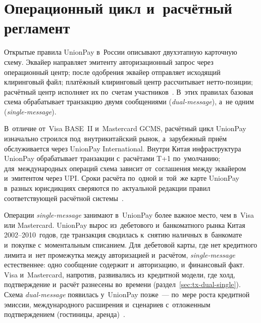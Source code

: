 
\section{Операционный цикл и~расчётный регламент}\label{sec:up-architecture}

Открытые правила UnionPay в~России описывают двухэтапную карточную схему.
Эквайер направляет эмитенту авторизационный запрос через операционный центр;
после одобрения эквайер отправляет исходящий клиринговый файл; платёжный
клиринговый центр рассчитывает нетто-позиции; расчётный центр исполняет их
по~счетам участников~\cite{unionpay-russia-rules}. В~этих правилах базовая
схема обрабатывает транзакцию двумя сообщениями (\textit{dual-message}), а~не одним
(\textit{single-message}).

В~отличие от~Visa BASE~II и~Mastercard GCMS, расчётный цикл UnionPay
изначально строился под~внутрикитайский рынок, а~зарубежный приём
обслуживается через UnionPay International. Внутри Китая инфраструктура
UnionPay обрабатывает транзакции с~расчётами T+1 по~умолчанию;
для~международных операций схема зависит от~соглашения между эквайером
и~эмитентом через UPI. Сроки расчёта по~одной и~той~же карте UnionPay в~разных
юрисдикциях сверяются по~актуальной редакции правил соответствующей расчётной
системы~\cite{unionpay-russia-rules}.

Операции \textit{single-message} занимают в~UnionPay более важное место, чем в~Visa
или Mastercard. UnionPay вырос из~дебетового и~банкоматного рынка Китая
\mbox{2002--2010}~годов, где транзакция сводилась к~снятию наличных в~банкомате и~покупке
с~моментальным списанием. Для~дебетовой карты, где нет кредитного лимита и~нет
промежутка между авторизацией и~расчётом, \textit{single-message} естественнее: одно
сообщение содержит и~авторизацию, и~финансовый факт. Visa и~Mastercard, напротив,
развивались из~кредитной модели, где холд, подтверждение и~расчёт разнесены
во~времени (раздел~\ref{sec:tx-dual-single}). Схема \textit{dual-message}
появилась у~UnionPay позже~--- по~мере роста кредитной эмиссии, международного расширения
и~сценариев с~отложенным подтверждением (гостиницы,
аренда)~\cite{unionpay-russia-rules}.

